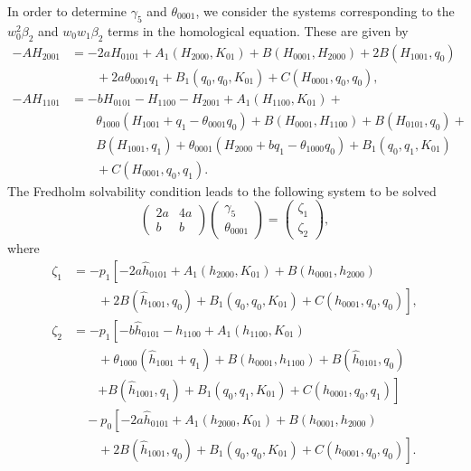 In order to determine $\gamma_5$ and $\theta_{0001}$, we consider the systems
corresponding to the $w_0^2\beta_2$ and $w_0w_1\beta_2$ terms in the homological
equation. These are given by
\begin{equation}
\label{eq:AH2001_AH1101}
\begin{aligned}
-AH_{2001} &= -2 a H_{0101} + A_1(H_{2000},K_{01}) +
	B(H_{0001},H_{2000}) + 2 B(H_{1001},q_0) \\
				& \qquad + 2 a \theta_{0001} q_1 +
				B_1(q_0,q_0,K_{01}) + C(H_{0001},q_0,q_0), \\
-AH_{1101} &= -b H_{0101} - H_{1100} - H_{2001} + A_1(H_{1100},K_{01}) + \\
				& \qquad \theta_{1000} (H_{1001} + q_1 - \theta_{0001} q_0) + 
				B(H_{0001},H_{1100}) + B(H_{0101},q_0) + \\
				& \qquad B(H_{1001},q_1) + \theta_{0001} (H_{2000} + b q_1 -
				\theta_{1000} q_0) + B_1(q_0,q_1,K_{01}) \\
				& \qquad + C(H_{0001},q_0,q_1).
\end{aligned}
\end{equation}
The Fredholm solvability condition leads to the following system to be solved
\begin{equation}
\label{eq:gamma_5_theta0001}
\begin{pmatrix}
				 2a &  4a \\
				  b &   b 
\end{pmatrix}
\begin{pmatrix}
				\gamma_5 \\
				\theta_{0001}
\end{pmatrix}
=
\begin{pmatrix}
				\zeta_1 \\
				\zeta_2 
\end{pmatrix},
\end{equation}
where
\begin{equation}
\label{eq:zeta1_zeta2}
\begin{aligned}
\zeta_1 &=  -p_1 \left[ -2 a\hat h_{0101}  
			+ A_1(h_{2000},K_{01}) + B(h_{0001},h_{2000}) \right.  \\
			& \left. \qquad + 2 B(\hat h_{1001},q_0)
			+ B_1(q_0,q_0,K_{01}) + C(h_{0001},q_0,q_0) \right], \\
\zeta_2 &= -p_1 \left[ -b \hat h_{0101} - h_{1100}  +
				A_1(h_{1100},K_{01}) \right. \\
				& \qquad + \theta_{1000} (\hat h_{1001} + q_1) + 
				B(h_{0001},h_{1100}) + B(\hat h_{0101},q_0) \\
				& \qquad \left. + B(\hat h_{1001},q_1) + B_1(q_0,q_1,K_{01})
				+ C(h_{0001},q_0,q_1) \right]  \\
				& \quad -p_0 \left[ -2 a \hat h_{0101} + A_1(h_{2000},K_{01}) +
				B(h_{0001},h_{2000}) \right. \\
				& \qquad + \left. 2 B( \hat h_{1001},q_0) +
				B_1(q_0,q_0,K_{01}) + C(h_{0001},q_0,q_0) \right] .
\end{aligned}
\end{equation}	
